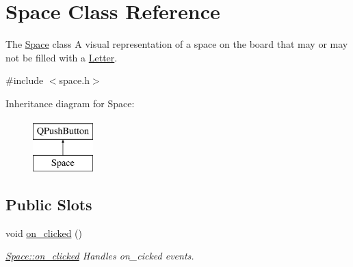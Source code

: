\hypertarget{class_space}{\section{Space Class Reference}
\label{class_space}
}


The \hyperlink{class_space}{Space} class A visual representation of a space on the board that may or may not be filled with a \hyperlink{class_letter}{Letter}.  




{\ttfamily \#include $<$space.\-h$>$}

Inheritance diagram for Space\-:\begin{figure}[H]
\begin{center}
\leavevmode
\includegraphics[height=2.000000cm]{class_space}
\end{center}
\end{figure}
\subsection*{Public Slots}
\begin{DoxyCompactItemize}
\item 
void \hyperlink{class_space_a762303973d71621706a7a8195bd0f946}{on\-\_\-clicked} ()
\begin{DoxyCompactList}\small\item\em \hyperlink{class_space_a762303973d71621706a7a8195bd0f946}{Space\-::on\-\_\-clicked} Handles on\-\_\-cicked events. \end{DoxyCompactList}\end{DoxyCompactItemize}
